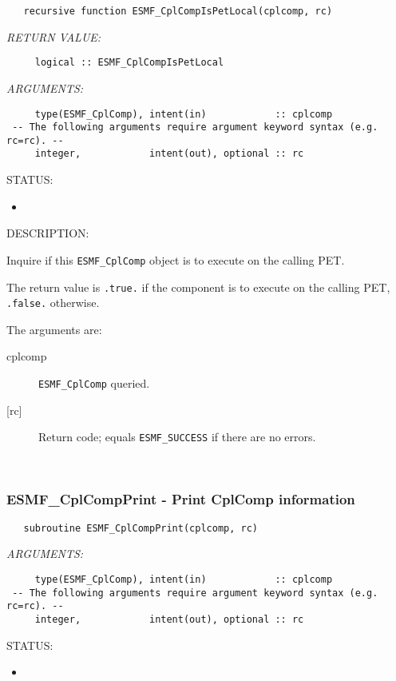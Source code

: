   
\begin{verbatim}   recursive function ESMF_CplCompIsPetLocal(cplcomp, rc)\end{verbatim}{\em RETURN VALUE:}
\begin{verbatim}     logical :: ESMF_CplCompIsPetLocal\end{verbatim}{\em ARGUMENTS:}
\begin{verbatim}     type(ESMF_CplComp), intent(in)            :: cplcomp
 -- The following arguments require argument keyword syntax (e.g. rc=rc). --
     integer,            intent(out), optional :: rc\end{verbatim}
{\sf STATUS:}
   \begin{itemize}
   \item{}
   \end{itemize}
  
{\sf DESCRIPTION:\\ }


   Inquire if this {\tt ESMF\_CplComp} object is to execute on the calling PET.
  
   The return value is {\tt .true.} if the component is to execute on the
   calling PET, {\tt .false.} otherwise.
  
   The arguments are:
   \begin{description}
   \item[cplcomp]
     {\tt ESMF\_CplComp} queried.
   \item[{[rc]}]
     Return code; equals {\tt ESMF\_SUCCESS} if there are no errors.
   \end{description}
   
 
\mbox{}\hrulefill\ 
 
\subsubsection [ESMF\_CplCompPrint] {ESMF\_CplCompPrint - Print CplComp information}


  
\begin{verbatim}   subroutine ESMF_CplCompPrint(cplcomp, rc)\end{verbatim}{\em ARGUMENTS:}
\begin{verbatim}     type(ESMF_CplComp), intent(in)            :: cplcomp
 -- The following arguments require argument keyword syntax (e.g. rc=rc). --
     integer,            intent(out), optional :: rc\end{verbatim}
{\sf STATUS:}
   \begin{itemize}
   \item{}
   \end{itemize}
  
